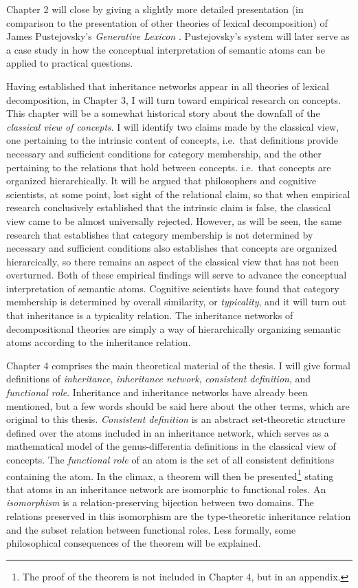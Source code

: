 Chapter 2 will close by giving a slightly more detailed presentation (in comparison to the presentation of other theories of lexical decomposition) of James Pustejovsky's \emph{Generative Lexicon} \cite{pustejovsky_generative_1998}. Pustejovsky's system will later serve as a case study in how the conceptual interpretation of semantic atoms can be applied to practical questions.

Having established that inheritance networks appear in all theories of lexical decomposition, in Chapter 3, I will turn toward empirical research on concepts. This chapter will be a somewhat historical story about the downfall of the \emph{classical view of concepts}. I will identify two claims made by the classical view, one pertaining to the intrinsic content of concepts, i.e.\ that definitions provide necessary and sufficient conditions for category membership, and the other pertaining to the relations that hold between concepts. i.e.\ that concepts are organized hierarchically. It will be argued that philosophers and cognitive scientists, at some point, lost sight of the relational claim, so that when empirical research conclusively established that the intrinsic claim is false, the classical view came to be almost universally rejected. However, as will be seen, the same research that establishes that category membership is not determined by necessary and sufficient conditions also establishes that concepts are organized hierarcically, so there remains an aspect of the classical view that has not been overturned. Both of these empirical findings will serve to advance the conceptual interpretation of semantic atoms. Cognitive scientists have found that category membership is determined by overall similarity, or \emph{typicality}, and it will turn out that inheritance is a typicality relation. The inheritance networks of decompositional theories are simply a way of hierarchically organizing semantic atoms according to the inheritance relation.

Chapter 4 comprises the main theoretical material of the thesis. I will give formal definitions of \emph{inheritance}, \emph{inheritance network}, \emph{consistent definition}, and \emph{functional role}. Inheritance and inheritance networks have already been mentioned, but a few words should be said here about the other terms, which are original to this thesis. \emph{Consistent definition} is an abstract set-theoretic structure defined over the atoms included in an inheritance network, which serves as a mathematical model of the genus-differentia definitions in the classical view of concepts. The \emph{functional role} of an atom is the set of all consistent definitions containing the atom. In the climax, a theorem will then be presented\footnote{The proof of the theorem is not included in Chapter 4, but in an appendix.} stating that atoms in an inheritance network are isomorphic to functional roles. An \emph{isomorphism} is a relation-preserving bijection between two domains. The relations preserved in this isomorphism are the type-theoretic inheritance relation and the subset relation between functional roles. Less formally, some philosophical consequences of the theorem will be explained.

